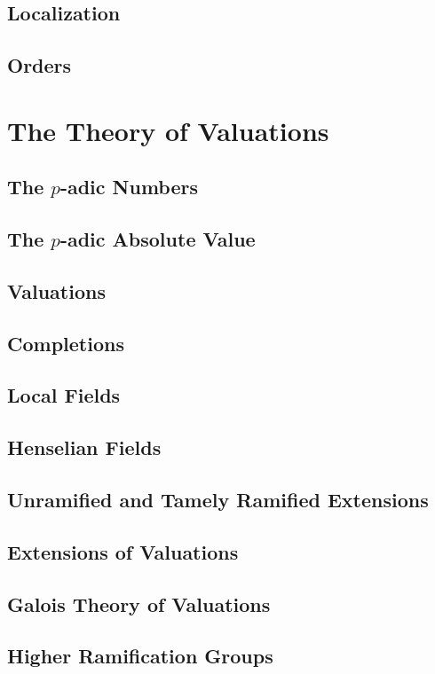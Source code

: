 \documentclass[oneside]{amsbook}
\numberwithin{ex}{section}
\begin{document}
\section{Localization}

\section{Orders}


\chapter{The Theory of Valuations}
\section{The $p$-adic Numbers}

\section{The $p$-adic Absolute Value}

\section{Valuations}

\section{Completions}

\section{Local Fields}

\section{Henselian Fields}

\section{Unramified and Tamely Ramified Extensions}

\section{Extensions of Valuations}

\section{Galois Theory of Valuations}

\section{Higher Ramification Groups}

\end{document}
